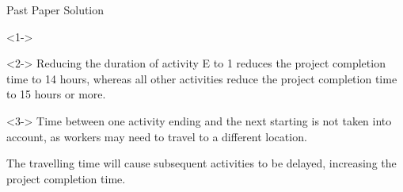 \documentclass[8pt]{beamer}
\begin{document}
\begin{frame}{Past Paper Solution}

\begin{solution}<1->
	

		\begin{center}
			
		\end{center}

\end{solution}

\begin{solution}<2->
	Reducing the duration of activity E to 1 reduces the project completion time to 14 hours, whereas all other activities reduce the project completion time to 15 hours or more.
\end{solution}

\begin{solution}<3->
	Time between one activity ending and the next starting is not taken into account, as workers may need to travel to a different location.

	The travelling time will cause subsequent activities to be delayed, increasing the project completion time.
\end{solution}

\end{frame}
\end{document}
